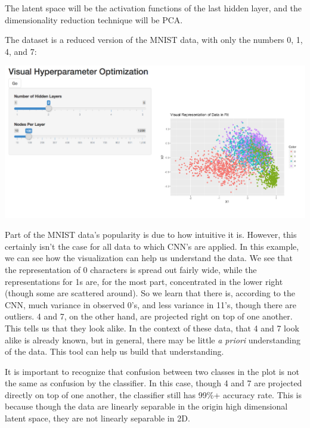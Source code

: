 \documentclass[a4paper]{article}
\begin{document}
The latent space will be the activation functions of the last hidden layer, and the dimensionality reduction technique will be PCA.

The dataset is a reduced version of the MNIST data, with only the numbers 0, 1, 4, and 7:

\includegraphics[width=\linewidth]{../images/nnet.png}

Part of the MNIST data's popularity is due to how intuitive it is. However, this certainly isn't the case for all data to which CNN's are applied. In this example, we can see how the visualization can help us understand the data. We see that the representation of 0 characters is spread out fairly wide, while the representations for 1s are, for the most part, concentrated in the lower right (though some are scattered around). So we learn that there is, according to the CNN, much variance in observed 0's, and less variance in 11's, though there are outliers. 4 and 7, on the other hand, are projected right on top of one another. This tells us that they look alike. In the context of these data, that 4 and 7 look alike is already known, but in general, there may be little \textit{a priori} understanding of the data. This tool can help us build that understanding.

It is important to recognize that confusion between two classes in the plot is not the same as confusion by the classifier. In this case, though 4 and 7 are projected directly on top of one another, the classifier still has 99\%+ accuracy rate. This is because though the data are linearly separable in the origin high dimensional latent space, they are not linearly separable in 2D.
\end{document}
